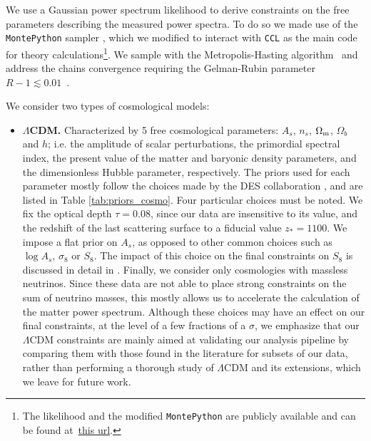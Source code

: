 \documentclass[a4paper,11pt]{article}
\newcommand{\Om}{\Omega_{\rm m}}
\newcommand{\lcdm}{$\Lambda$CDM\xspace}
\newcommand{\ccl}{\texttt{CCL}\xspace}
\newcommand{\mpyth}{\texttt{MontePython}\xspace}
\newcommand{\des}{DES\xspace}
\begin{document}
      We use a Gaussian power spectrum likelihood to derive constraints on the free parameters describing the measured power spectra. To do so we made use of the \mpyth sampler \cite{1210.7183,1804.07261}, which we modified to interact with \ccl as the main code for theory calculations\footnote{The likelihood and the modified \texttt{MontePython} are publicly available and can be found at~\href{https://github.com/carlosggarcia/montepython_public/tree/emilio/montepython/likelihoods/cl_cross_corr_v3}{this url}.}. We sample with the Metropolis-Hasting algorithm~\cite{Metropolis, Hastings} and address the chains convergence requiring the Gelman-Rubin parameter $R-1 \lesssim 0.01$~\cite{GelmanRubin}.
      
      We consider two types of cosmological models:
      \begin{itemize}
        \item {\bf \lcdm.} Characterized by 5 free cosmological parameters: $A_s$, $n_s$, $\Om$, $\Omega_b$ and $h$; i.e. the amplitude of scalar perturbations, the primordial spectral index, the present value of the matter and baryonic density parameters, and the dimensionless Hubble parameter, respectively. The priors used for each parameter mostly follow the choices made by the \des collaboration \cite{1810.02322}, and are listed in Table \ref{tab:priors_cosmo}. Four particular choices must be noted. We fix the optical depth $\tau=0.08$, since our data are insensitive to its value, and the redshift of the last scattering surface to a fiducial value $z_* = 1100$. We impose a flat prior on $A_s$, as opposed to other common choices such as $\log A_s$, $\sigma_8$ or $S_8$. The impact of this choice on the final constraints on $S_8$ is discussed in detail in \cite{1906.09262}. Finally, we consider only cosmologies with massless neutrinos. Since these data are not able to place strong constraints on the sum of neutrino masses, this mostly allows us to accelerate the calculation of the matter power spectrum. Although these choices may have an effect on our final constraints, at the level of a few fractions of a $\sigma$, we emphasize that our \lcdm constraints are mainly aimed at validating our analysis pipeline by comparing them with those found in the literature for subsets of our data, rather than performing a thorough study of \lcdm and its extensions, which we leave for future work. 

\end{itemize}
\end{document}
